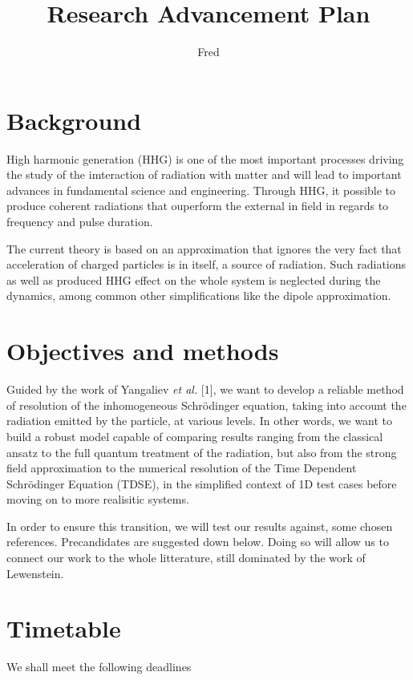 \documentclass[11pt]{article}
\title{Research Advancement Plan}
\author{Fred}
\date{}
\begin{document}
\maketitle

\section{Background}
High harmonic generation (HHG) is one of the most important processes
 driving the study of the imteraction of radiation with matter
and will lead to important advances in fundamental science and engineering.
Through HHG, it possible to produce coherent radiations that ouperform the 
external in field in regards to frequency and pulse duration. 

The current theory is based on an approximation that ignores the very fact that 
acceleration of charged particles is in itself, a source of radiation. 
Such radiations as well as produced HHG effect on the whole system is neglected
during the dynamics, among common other simplifications like 
the dipole approximation.
 
\section{Objectives and methods}

Guided by the work of Yangaliev \textit{et al.} [1], 
we want to develop a reliable method of resolution 
of the inhomogeneous Schr\"odinger equation, 
taking into account the radiation emitted by the particle, at various levels.
In other words, we want to build a robust model capable of comparing
results ranging from the classical ansatz 
to the full quantum treatment of the radiation, but also from the 
strong field approximation to the numerical resolution of the 
Time Dependent Schr\"odinger Equation (TDSE), 
in the simplified context of 1D test cases 
before moving on to more realisitic systems.

In order to ensure this transition, we will test our results against, 
some chosen references. Precandidates are suggested down below.
Doing so will allow us to connect our work to the whole litterature, 
still dominated by the work of Lewenstein. 

\section{Timetable}
We shall meet the following deadlines
\end{document}
